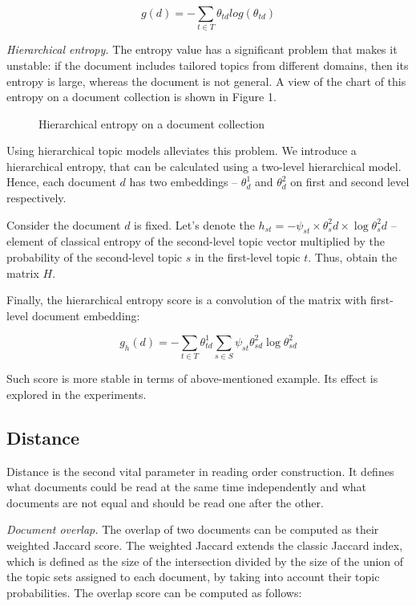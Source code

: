 \documentclass[12pt,twoside]{article}
\begin{document}
	\begin{equation}
	g(d) = -\sum\limits_{t \in T} \theta_{td}log(\theta_{td})
	\end{equation}
	
	\textit{Hierarchical entropy.} The entropy value has a significant problem that makes it unstable: if the document includes tailored topics from different domains, then its entropy is large, whereas the document is not general. A view of the chart of this entropy on a document collection is shown in Figure 1.
	
	\begin{figure}
        \centering
    	\caption{Hierarchical entropy on a document collection}
	\end{figure}
	
	Using hierarchical topic models alleviates this problem. We introduce a hierarchical entropy, that can be calculated using a two-level hierarchical model. Hence, each document $d$ has two embeddings -- $\theta^1_d$ and $\theta^2_d$ on first and second level respectively.
	
	Consider the document $d$ is fixed. Let's denote the $h_{st} = - \psi_{st} \times \theta^2_sd \times \log \theta^2_sd$ -- element of classical entropy of the second-level topic vector multiplied by the probability of the second-level topic $s$ in the first-level topic $t$. Thus, obtain the matrix $H$.
	
	Finally, the hierarchical entropy score is a convolution of the matrix with first-level document embedding:
	
	\begin{equation}
	    g_h(d) = -\sum\limits_{t \in T} \theta^1_{td} \sum\limits_{s \in S} \psi_{st} \theta^2_{sd} \log \theta^2_{sd}
	\end{equation}
	
	Such score is more stable in terms of above-mentioned example. Its effect is explored in the experiments.
	
	\subsection{Distance}
	
	Distance is the second vital parameter in reading order construction. It defines what documents could be read at the same time independently and what documents are not equal and should be read one after the other.
	
	\textit{Document overlap.} The overlap of two documents can be computed as their weighted Jaccard score\cite{Grefenstette94}. The weighted Jaccard extends the classic Jaccard index, which is defined as the size of the intersection divided by the size of the union of the topic sets assigned to each document, by taking into account their topic probabilities. The overlap score can be computed as follows:
	
\end{document}
